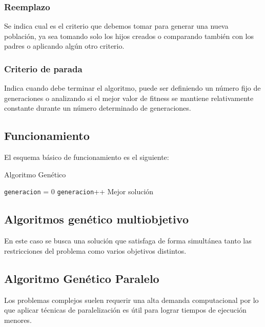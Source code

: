 \subsubsection{Reemplazo} 
Se indica cual es el criterio que debemos tomar para generar una nueva población, ya sea tomando solo los hijos creados o comparando también con los padres o aplicando algún otro criterio.

\subsubsection{Criterio de parada} 
Indica cuando debe terminar el algoritmo, puede ser definiendo un número fijo de generaciones o analizando si el mejor valor de fitness se mantiene relativamente constante durante un número determinado de generaciones.

\subsection{Funcionamiento}

El esquema básico de funcionamiento es el siguiente:


\begin{algorithm}%
	\caption{Algoritmo Genético}
	\label{alg:algoritmo_genetico_simple}
	\begin{algorithmic} [1] 
		{
			\STATE \texttt{generacion} = 0
			\STATE \texttt{generacion}++
			\ENDWHILE
			\RETURN Mejor solución
		}
	\end{algorithmic}
\end{algorithm}




\subsection{Algoritmos genético multiobjetivo}

En este caso se busca una solución que satisfaga de forma simultánea tanto las restricciones del problema como varios objetivos distintos.



\subsection{Algoritmo Genético Paralelo}
Los problemas complejos suelen requerir una alta demanda computacional por lo que aplicar técnicas de paralelización es útil para lograr tiempos de ejecución menores.

